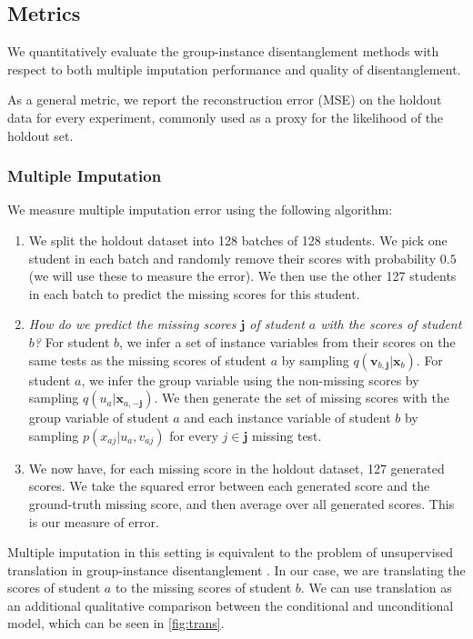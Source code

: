 \documentclass[nohyperref]{article}
\theoremstyle{plain}
\theoremstyle{definition}
\theoremstyle{remark}
\begin{document}
\subsection{Metrics}

We quantitatively evaluate the group-instance disentanglement methods with respect to both multiple imputation performance and quality of disentanglement.

As a general metric, we report the reconstruction error (MSE) on the holdout data for every experiment, commonly used as a proxy for the likelihood of the holdout set.

\subsubsection{Multiple Imputation}

We measure multiple imputation error using the following algorithm:
\begin{enumerate}
\item We split the holdout dataset into 128 batches of 128 students. We pick one student in each batch and randomly remove their scores with probability $0.5$ (we will use these to measure the error). We then use the other 127 students in each batch to predict the missing scores for this student.
\item \textit{How do we predict the missing scores $\mathbf{j}$ of student $a$ with the scores of student $b$?} For student $b$, we infer a set of instance variables from their scores on the same tests as the missing scores of student $a$ by sampling $q(\mathbf{v}_{b, \mathbf{j}} | \mathbf{x}_b)$. For student $a$, we infer the group variable using the non-missing scores by sampling $q(u_a | \mathbf{x}_{a, -\mathbf{j}})$. We then generate the set of missing scores with the group variable of student $a$ and each instance variable of student $b$ by sampling $p(x_{aj} | u_a, v_{aj})$ for every $j \in \mathbf{j}$ missing test.
\item We now have, for each missing score in the holdout dataset, 127 generated scores. We take the squared error between each generated score and the ground-truth missing score, and then average over all generated scores. This is our measure of error.
\end{enumerate}

Multiple imputation in this setting is equivalent to the problem of unsupervised translation in group-instance disentanglement \citep{Tenenbaum2000SeparatingSA}.  In our case, we are translating the scores of student $a$ to the missing scores of student $b$. We can use translation as an additional qualitative comparison between the conditional and unconditional model, which can be seen in \cref{fig:trans}.
\end{document}

